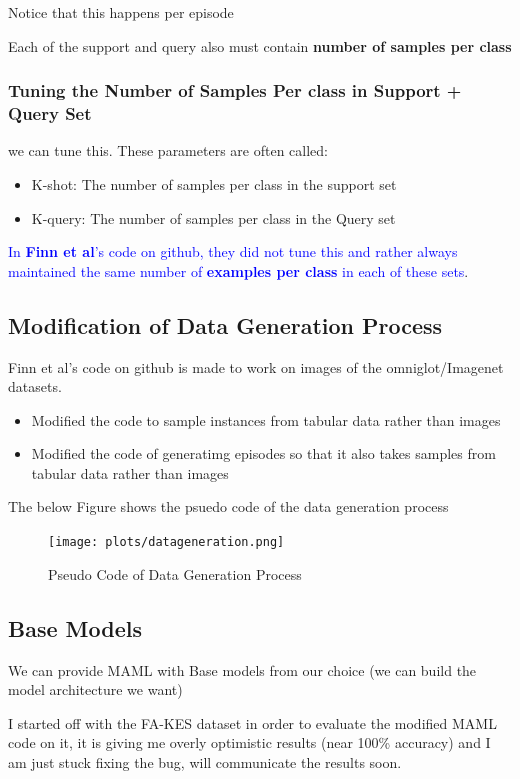 \documentclass{article}
\begin{document}
Notice that this happens per episode

\noindent Each of the support and query also must contain \textbf{number of samples per class}

\subsubsection*{Tuning the Number of Samples Per class in Support + Query Set}
we can tune this. These parameters are often called:
\begin{itemize}
    \item K-shot: The number of samples per class in the support set
    \item K-query: The number of samples per class in the Query set
\end{itemize}

\textcolor{blue}{In \textbf{Finn et al}'s code on github, they did not tune this and rather always maintained the same number of \textbf{examples per class} in each of these sets}.

\subsection{Modification of Data Generation Process}
Finn et al's code on github is made to work on images of the omniglot/Imagenet datasets.
\begin{itemize}
    \item Modified the code to sample instances from tabular data rather than images
    \item Modified the code of generatimg episodes so that it also takes samples from tabular data rather than images
\end{itemize}

The below Figure shows the psuedo code of the data generation process
\begin{figure}[H]
    \texttt{[image: plots/datageneration.png]}
    \caption{Pseudo Code of Data Generation Process}
    \label{fig:my_label}
\end{figure}

\subsection*{Base Models}
We can provide MAML with Base models from our choice (we can build the model architecture we want)

\noindent I started off with the FA-KES dataset in order to evaluate the modified MAML code on it, it is giving me overly optimistic results (near 100\% accuracy) and I am just stuck fixing the bug, will communicate the results soon.
\end{document}
